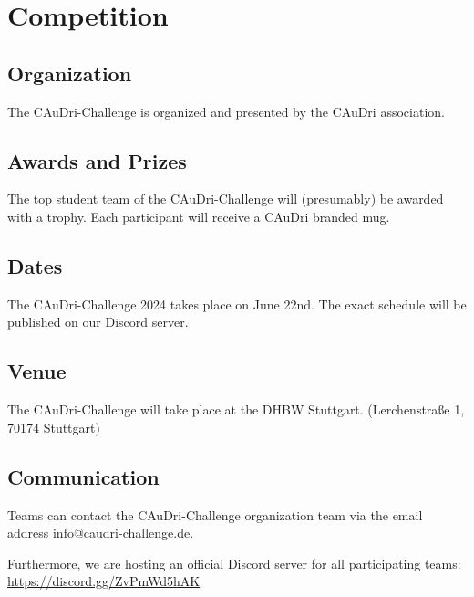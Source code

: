 \chapter{Competition}

\section{Organization}

The CAuDri-Challenge is organized and presented by the CAuDri association.

\section{Awards and Prizes}

The top student team of the CAuDri-Challenge will (presumably) be awarded with
a trophy. Each participant will receive a CAuDri branded mug.

\section{Dates}

The CAuDri-Challenge 2024 takes place on June 22nd. The exact schedule will be
published on our Discord server.

\section{Venue}

The CAuDri-Challenge will take place at the DHBW Stuttgart. (Lerchenstraße 1,
70174 Stuttgart)

\section{Communication}

Teams can contact the CAuDri-Challenge organization team via the email address
info@caudri-challenge.de.

Furthermore, we are hosting an official Discord server for all participating
teams:\\ \href{https://discord.gg/ZvPmWd5hAK}{https://discord.gg/ZvPmWd5hAK}
